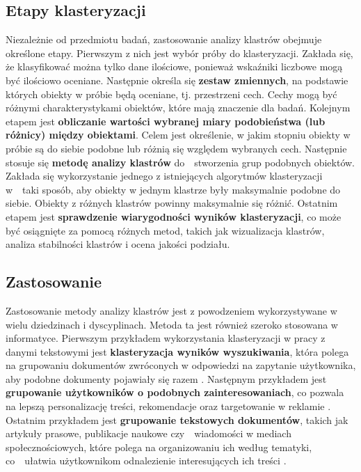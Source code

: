 	\subsection{Etapy klasteryzacji}
		Niezależnie od przedmiotu badań, zastosowanie analizy klastrów obejmuje określone etapy. Pierwszym z nich jest wybór próby do klasteryzacji. Zakłada się, że klasyfikować można tylko dane ilościowe, ponieważ wskaźniki liczbowe mogą być ilościowo oceniane. Następnie określa się \textbf{zestaw zmiennych}, na podstawie których obiekty w próbie będą oceniane, tj. przestrzeni cech. Cechy mogą być różnymi charakterystykami obiektów, które mają znaczenie dla badań. Kolejnym etapem jest \textbf{obliczanie wartości wybranej miary podobieństwa (lub różnicy) między obiektami}. Celem jest określenie, w jakim stopniu obiekty w próbie są do siebie podobne lub różnią się względem wybranych cech. Następnie stosuje się \textbf{metodę analizy klastrów} do~~stworzenia grup podobnych obiektów. Zakłada się wykorzystanie jednego z istniejących algorytmów klasteryzacji w~~taki sposób, aby obiekty w jednym klastrze były maksymalnie podobne do siebie. Obiekty z różnych klastrów powinny maksymalnie się różnić. Ostatnim etapem jest \textbf{sprawdzenie wiarygodności wyników klasteryzacji}, co może być osiągnięte za pomocą różnych metod, takich jak wizualizacja klastrów, analiza stabilności klastrów i ocena jakości podziału.

	\subsection{Zastosowanie}
		Zastosowanie metody analizy klastrów jest z powodzeniem wykorzystywane w wielu dziedzinach i dyscyplinach. Metoda ta jest również szeroko stosowana w informatyce. Pierwszym przykładem wykorzystania klasteryzacji w pracy z danymi tekstowymi jest \textbf{klasteryzacja wyników wyszukiwania}, która polega na grupowaniu dokumentów zwróconych w odpowiedzi na zapytanie użytkownika, aby podobne dokumenty pojawiały się razem \cite{SearchClustering}. Następnym przykładem jest \textbf{grupowanie użytkowników o podobnych zainteresowaniach}, co pozwala na lepszą personalizację treści, rekomendacje oraz targetowanie w reklamie \cite{UserClustering}. Ostatnim przykładem jest \textbf{grupowanie tekstowych dokumentów}, takich jak artykuły prasowe, publikacje naukowe czy~~wiadomości w mediach społecznościowych, które polega na organizowaniu ich według tematyki, co~~ułatwia użytkownikom odnalezienie interesujących ich treści \cite{SearchClustering}.
		


